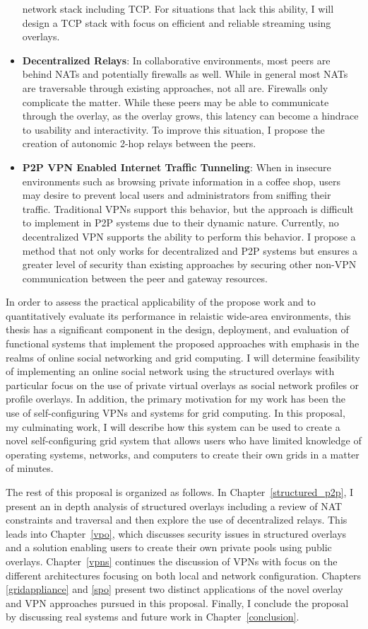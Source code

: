 \begin{itemize}
network stack including TCP.  For situations that lack this ability, I will
design a TCP stack with focus on efficient and reliable streaming using
overlays.
\item \textbf{Decentralized Relays}:  In collaborative environments, most peers
are behind NATs and potentially firewalls as well.  While in general most
NATs are traversable through existing approaches, not all are.  Firewalls only
complicate the matter.  While these peers may be able to communicate through
the overlay, as the overlay grows, this latency can become a hindrace to
usability and interactivity.  To improve this situation, I propose the creation
of autonomic 2-hop relays between the peers.
\item \textbf{P2P VPN Enabled Internet Traffic Tunneling}: When in insecure
environments such as browsing private information in a coffee shop, users may
desire to prevent local users and administrators from sniffing their traffic.
Traditional VPNs support this behavior, but the approach is difficult to
implement in P2P systems due to their dynamic nature.  Currently, no
decentralized VPN supports the ability to perform this behavior.  I propose a
method that not only works for decentralized and P2P systems but ensures a
greater level of security than existing approaches by securing other non-VPN
communication between the peer and gateway resources.
\end{itemize}

In order to assess the practical applicability of  the propose work and to
quantitatively evaluate its performance in relaistic wide-area environments,
this thesis has a significant component in the design, deployment, and
evaluation of functional systems that implement the proposed approaches with
emphasis in the realms of online social networking and grid computing.  I will
determine feasibility of implementing an online social network using the 
structured overlays with particular focus on the use of private virtual
overlays as social network profiles or profile overlays.  In addition, the
primary motivation for my work has been the use of self-configuring VPNs and
systems for grid computing.  In this proposal, my culminating work, I will
describe how this system can be used to create a novel self-configuring grid
system that allows users who have limited knowledge of operating systems,
networks, and computers to create their own grids in a matter of minutes.

The rest of this proposal is organized as follows.  In
Chapter~\ref{structured_p2p}, I present an in depth analysis of structured
overlays including a review of NAT constraints and traversal and then explore
the use of decentralized relays.  This leads into Chapter~\ref{vpo}, which
discusses security issues in structured overlays and a solution enabling users
to create their own private pools using public overlays.  Chapter~\ref{vpns}
continues the discussion of VPNs with focus on the different architectures 
focusing on both local and network configuration.  Chapters \ref{gridappliance}
and \ref{spo} present two distinct applications of the novel overlay and VPN
approaches pursued in this proposal.  Finally, I conclude the proposal by 
discussing real systems and future work in Chapter~\ref{conclusion}.

